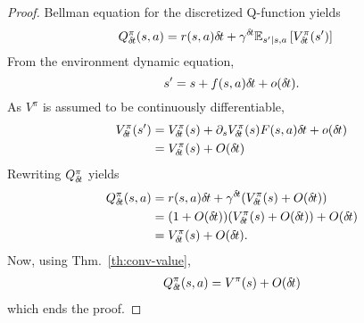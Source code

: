 \begin{proof}
	Bellman equation for the discretized Q-function yields
  \begin{align}
    Q^\pi_{\delta\hspace{-.1em}t}(s, a) &= r(s, a){\delta\hspace{-.1em}t} + \gamma^{\delta\hspace{-.1em}t} \mathbb{E}_{s'|s, a}\left[V^\pi_{\delta\hspace{-.1em}t}(s')\right] 
  \end{align}
  From the environment dynamic equation, 
  \begin{equation}
	  s' = s + f(s, a) {\delta\hspace{-.1em}t} + o({\delta\hspace{-.1em}t}).
  \end{equation}As $V^\pi$ is assumed to be continuously differentiable,
  \begin{align}
	  V^\pi_{\delta\hspace{-.1em}t}(s') &= V^\pi_{\delta\hspace{-.1em}t}(s) + \partial_s V^\pi_{\delta\hspace{-.1em}t}(s) F(s, a){\delta\hspace{-.1em}t} + o({\delta\hspace{-.1em}t})\\
			    &= V^\pi_{\delta\hspace{-.1em}t}(s) + O({\delta\hspace{-.1em}t})
  \end{align}
  Rewriting $Q^\pi_{\delta\hspace{-.1em}t}$ yields
  \begin{align}
	  Q^\pi_{\delta\hspace{-.1em}t}(s, a) &= r(s, a){\delta\hspace{-.1em}t} + \gamma^{\delta\hspace{-.1em}t} (V^\pi_{\delta\hspace{-.1em}t}(s) + O({\delta\hspace{-.1em}t}))\\
			      &= (1 + O({\delta\hspace{-.1em}t})) (V^\pi_{\delta\hspace{-.1em}t}(s) + O({\delta\hspace{-.1em}t})) + O({\delta\hspace{-.1em}t})\\
			      &= V^\pi_{\delta\hspace{-.1em}t}(s) + O({\delta\hspace{-.1em}t}).
  \end{align}
  Now, using Thm.~\ref{th:conv-value},
  \begin{align}
	  Q^\pi_{\delta\hspace{-.1em}t}(s, a) = V^\pi(s) + O({\delta\hspace{-.1em}t})
  \end{align}
  which ends the proof.
  \end{proof}
